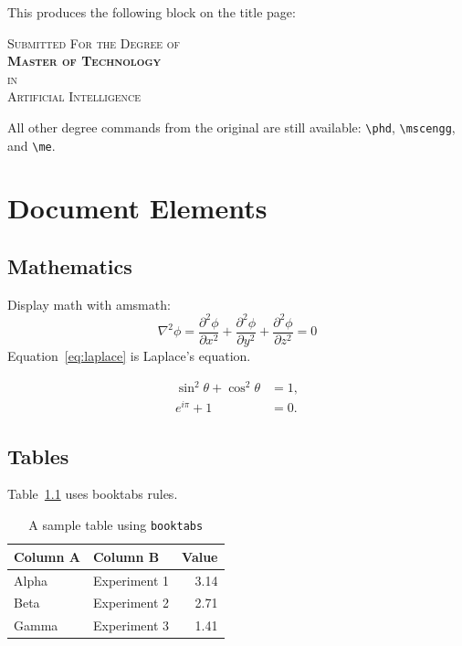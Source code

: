 \documentclass[12pt,a4paper]{report}
\begin{document}
This produces the following block on the title page:
\begin{center}
  \scshape Submitted For the Degree of \\[0.8ex]
  {\large\bfseries Master of Technology} \\[0.4ex]
  \scshape in \\[0.2ex]
  \normalfont Artificial Intelligence
\end{center}

All other degree commands from the original are still available:
\verb|\phd|, \verb|\mscengg|, and \verb|\me|.

\chapter{Document Elements}
\label{ch:elements}

\section{Mathematics}

Display math with \textsf{amsmath}:
\begin{equation}
  \nabla^2 \phi = \frac{\partial^2 \phi}{\partial x^2}
                + \frac{\partial^2 \phi}{\partial y^2}
                + \frac{\partial^2 \phi}{\partial z^2} = 0
  \label{eq:laplace}
\end{equation}
Equation~\eqref{eq:laplace} is Laplace's equation.

\begin{align}
  \sin^2\theta + \cos^2\theta &= 1, \\
  e^{i\pi} + 1                &= 0.
\end{align}

\section{Tables}

Table~\ref{tab:sample} uses \textsf{booktabs} rules.

\begin{table}[ht]
  \centering
  \caption{A sample table using \texttt{booktabs}}
  \label{tab:sample}
  \begin{tabular}{@{}llr@{}}
    \toprule
    \textbf{Column A} & \textbf{Column B} & \textbf{Value} \\
    \midrule
    Alpha  & Experiment 1 & 3.14 \\
    Beta   & Experiment 2 & 2.71 \\
    Gamma  & Experiment 3 & 1.41 \\
    \bottomrule
  \end{tabular}
\end{table}
\end{document}
